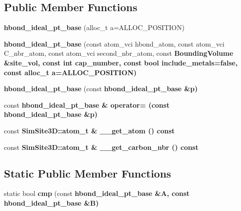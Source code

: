 \subsection*{Public Member Functions}
\begin{CompactItemize}
\item 
\textbf{hbond\_\-ideal\_\-pt\_\-base} (alloc\_\-t a=ALLOC\_\-POSITION)\label{classSimSite3D_1_1hbond__ideal__pt__base_6c727a2312275eeca47a7a36b27ff531}

\item 
\textbf{hbond\_\-ideal\_\-pt\_\-base} (const atom\_\-vci hbond\_\-atom, const atom\_\-vci C\_\-nbr\_\-atom, const atom\_\-vci second\_\-nbr\_\-atom, const \bf{Bounding\-Volume} \&site\_\-vol, const int cap\_\-number, const bool include\_\-metals=false, const alloc\_\-t a=ALLOC\_\-POSITION)\label{classSimSite3D_1_1hbond__ideal__pt__base_8c6aebede051225c5d7732dff3c9de61}

\item 
\textbf{hbond\_\-ideal\_\-pt\_\-base} (const \bf{hbond\_\-ideal\_\-pt\_\-base} \&p)\label{classSimSite3D_1_1hbond__ideal__pt__base_6b1afae556e880d14099bdca58304d46}

\item 
const \bf{hbond\_\-ideal\_\-pt\_\-base} \& \textbf{operator=} (const \bf{hbond\_\-ideal\_\-pt\_\-base} \&p)\label{classSimSite3D_1_1hbond__ideal__pt__base_a8a595d97addfd2dc71a74230a022dec}

\item 
const \bf{SimSite3D::atom\_\-t} \& \textbf{\_\-\_\-get\_\-atom} () const \label{classSimSite3D_1_1hbond__ideal__pt__base_4ad13839630fecd1c9d561e081b7b18e}

\item 
const \bf{SimSite3D::atom\_\-t} \& \textbf{\_\-\_\-get\_\-carbon\_\-nbr} () const \label{classSimSite3D_1_1hbond__ideal__pt__base_1e47efb94434d32735034ade4ee4a7fe}

\end{CompactItemize}
\subsection*{Static Public Member Functions}
\begin{CompactItemize}
\item 
static bool \textbf{cmp} (const \bf{hbond\_\-ideal\_\-pt\_\-base} \&A, const \bf{hbond\_\-ideal\_\-pt\_\-base} \&B)\label{classSimSite3D_1_1hbond__ideal__pt__base_6d6b4ad446addecc3079229713313731}

\end{CompactItemize}
